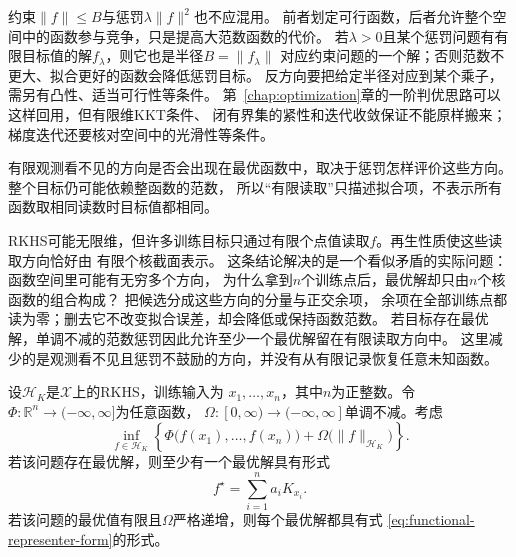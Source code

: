 约束$\lVert f\rVert\leq B$与惩罚$\lambda\lVert f\rVert^2$也不应混用。
前者划定可行函数，后者允许整个空间中的函数参与竞争，只是提高大范数函数的代价。
若$\lambda>0$且某个惩罚问题有有限目标值的解$f_\lambda$，则它也是半径$B=\lVert f_\lambda\rVert$
对应约束问题的一个解；否则范数不更大、拟合更好的函数会降低惩罚目标。
反方向要把给定半径对应到某个乘子，需另有凸性、适当可行性等条件。
第~\ref{chap:optimization}章的一阶判优思路可以这样回用，但有限维KKT条件、
闭有界集的紧性和迭代收敛保证不能原样搬来；梯度迭代还要核对空间中的光滑性等条件。


有限观测看不见的方向是否会出现在最优函数中，取决于惩罚怎样评价这些方向。
整个目标仍可能依赖整函数的范数，
所以“有限读取”只描述拟合项，不表示所有函数取相同读数时目标值都相同。


RKHS可能无限维，但许多训练目标只通过有限个点值读取$f$。再生性质使这些读取方向恰好由
有限个核截面表示。
这条结论解决的是一个看似矛盾的实际问题：函数空间里可能有无穷多个方向，
为什么拿到$n$个训练点后，最优解却只由$n$个核函数的组合构成？
把候选分成这些方向的分量与正交余项，
余项在全部训练点都读为零；删去它不改变拟合误差，却会降低或保持函数范数。
若目标存在最优解，单调不减的范数惩罚因此允许至少一个最优解留在有限读取方向中。
这里减少的是观测看不见且惩罚不鼓励的方向，并没有从有限记录恢复任意未知函数。

\begin{theorem}[有限样本表示定理]
\label{thm:functional-representer-theorem}
设$\mathcal{H}_K$是$\mathcal{X}$上的RKHS，训练输入为
$x_1,\ldots,x_n$，其中$n$为正整数。令
$\Phi:\mathbb{R}^n\to(-\infty,\infty]$为任意函数，
$\Omega:[0,\infty)\to(-\infty,\infty]$单调不减。考虑
\begin{equation}
  \inf_{f\in\mathcal{H}_K}
  \left\{
    \Phi\bigl(f(x_1),\ldots,f(x_n)\bigr)
    +
    \Omega\bigl(\lVert f\rVert_{\mathcal{H}_K}\bigr)
  \right\}.
  \label{eq:functional-representer-objective}
\end{equation}
若该问题存在最优解，则至少有一个最优解具有形式
\begin{equation}
  f^\star
  =
  \sum_{i=1}^{n}a_iK_{x_i}.
  \label{eq:functional-representer-form}
\end{equation}
若该问题的最优值有限且$\Omega$严格递增，则每个最优解都具有式
\eqref{eq:functional-representer-form}的形式。
\end{theorem}

